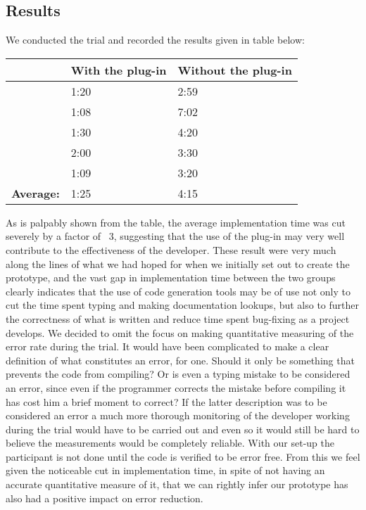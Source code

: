 \subsection{Results}
\label{Results}
We conducted the trial and recorded the results given in table below:

\begin{center}
\begin{tabular}{|l|l|l|}
    \hline
    ~        & {\bf With the plug-in} & {\bf Without the plug-in} \\ \hline
    ~        & 1:20             & 2:59                \\ \hline
    ~        & 1:08             & 7:02                \\ \hline
    ~        & 1:30             & 4:20                \\ \hline
    ~        & 2:00             & 3:30                \\ \hline
    ~        & 1:09             & 3:20                   \\ \hline
    {\bf Average:} & 1:25             & 4:15                \\ \hline
\end{tabular}
\end{center}

As is palpably shown from the table, the average implementation time was cut severely by a factor of ~3, suggesting that the use of the plug-in may very well contribute to the effectiveness of the developer. These result were very much along the lines of what we had hoped for when we initially set out to create the prototype, and the vast gap in implementation time between the two groups clearly indicates that the use of code generation tools may be of use not only to cut the time spent typing and making documentation lookups, but also to further the correctness of what is written and reduce time spent bug-fixing as a project develops.
We decided to omit the focus on making quantitative measuring of the error rate during the trial. It would have been complicated to make a clear definition of what constitutes an error, for one. Should it only be something that prevents the code from compiling? Or is even a typing mistake to be considered an error, since even if the programmer corrects the mistake before compiling it has cost him a brief moment to correct? If the latter description was to be considered an error a much more thorough monitoring of the developer working during the trial would have to be carried out and even so it would still be hard to believe the measurements would be completely reliable.
With our set-up the participant is not done until the code is verified to be error free. From this we feel given the noticeable cut in implementation time, in spite of not having an accurate quantitative measure of it, that we can rightly infer our prototype has also had a positive impact on error reduction.  








